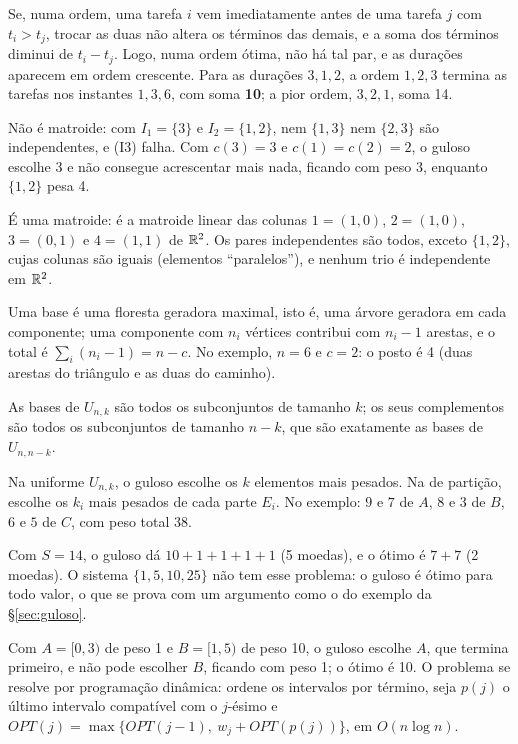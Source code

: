  Se, numa ordem, uma tarefa $i$ vem imediatamente antes de uma tarefa $j$ com $t_i>t_j$, trocar as duas não altera os términos das demais, e a soma dos términos diminui de $t_i-t_j$. Logo, numa ordem ótima, não há tal par, e as durações aparecem em ordem crescente. Para as durações $3,1,2$, a ordem $1,2,3$ termina as tarefas nos instantes $1,3,6$, com soma \textbf{10}; a pior ordem, $3,2,1$, soma 14.

 Não é matroide: com $I_1=\{3\}$ e $I_2=\{1,2\}$, nem $\{1,3\}$ nem $\{2,3\}$ são independentes, e (I3) falha. Com $c(3)=3$ e $c(1)=c(2)=2$, o guloso escolhe 3 e não consegue acrescentar mais nada, ficando com peso 3, enquanto $\{1,2\}$ pesa 4.

 É uma matroide: é a matroide linear das colunas $1=(1,0)$, $2=(1,0)$, $3=(0,1)$ e $4=(1,1)$ de $\mathbb{R}^2$. Os pares independentes são todos, exceto $\{1,2\}$, cujas colunas são iguais (elementos ``paralelos''), e nenhum trio é independente em $\mathbb{R}^2$.

 Uma base é uma floresta geradora maximal, isto é, uma árvore geradora em cada componente; uma componente com $n_i$ vértices contribui com $n_i-1$ arestas, e o total é $\sum_i(n_i-1)=n-c$. No exemplo, $n=6$ e $c=2$: o posto é 4 (duas arestas do triângulo e as duas do caminho).

 As bases de $U_{n,k}$ são todos os subconjuntos de tamanho $k$; os seus complementos são todos os subconjuntos de tamanho $n-k$, que são exatamente as bases de $U_{n,n-k}$.

 Na uniforme $U_{n,k}$, o guloso escolhe os $k$ elementos mais pesados. Na de partição, escolhe os $k_i$ mais pesados de cada parte $E_i$. No exemplo: $9$ e $7$ de $A$, $8$ e $3$ de $B$, $6$ e $5$ de $C$, com peso total 38.

 Com $S=14$, o guloso dá $10+1+1+1+1$ (5 moedas), e o ótimo é $7+7$ (2 moedas). O sistema $\{1,5,10,25\}$ não tem esse problema: o guloso é ótimo para todo valor, o que se prova com um argumento como o do exemplo da §\ref{sec:guloso}.

 Com $A=[0,3)$ de peso 1 e $B=[1,5)$ de peso 10, o guloso escolhe $A$, que termina primeiro, e não pode escolher $B$, ficando com peso 1; o ótimo é 10. O problema se resolve por programação dinâmica: ordene os intervalos por término, seja $p(j)$ o último intervalo compatível com o $j$-ésimo e $OPT(j)=\max\{OPT(j-1),\ w_j+OPT(p(j))\}$, em $O(n\log n)$.

